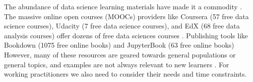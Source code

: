 \documentclass[020-persona\_validation.tex]{subfiles}
\begin{document}


    The abundance of data science learning materials have made it a commodity
    \cite{krossDemocratizationDataScience2020}.
    The massive online open courses (MOOCs) providers like
    Coursera (57 free data science courses),
    Udacity (7 free data science courses), and
    EdX (68 free data analysis courses)
    offer dozens of free data sciences courses
    \cite{courseraTopFreeCourses, udacityDataScienceOnline, edxDataAnalysisCourses}.
    Publishing tools like Bookdown (1075 free online books) and
    JupyterBook (63 free online books)
    \cite{bookdownAllBooksBookdown, executablebookprojectGalleryJupyterBooks}
    However, many of these resources are geared towards general populations or general topics,
    and examples are not always relevant to new learners
    \cite{krossDemocratizationDataScience2020}.
    For working practitioners we also need to consider their needs and time constraints.
\end{document}
